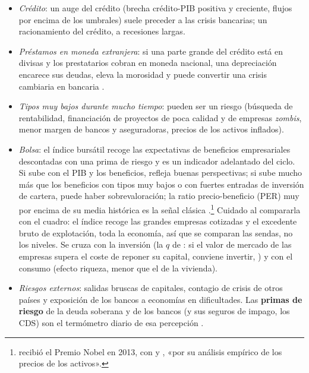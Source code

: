 \documentclass[11pt]{article}
\begin{document}
\begin{itemize}
\begin{itemize}
  \item \emph{con qué se cruza}: consumo (efecto riqueza), inversión residencial, crédito y morosidad, y movilidad laboral (vivienda cara, peor emparejamiento) .
  \end{itemize}
\item \emph{Crédito}: un auge del crédito (brecha crédito-PIB positiva y creciente, flujos por encima de los umbrales) suele preceder a las crisis bancarias; un racionamiento del crédito, a recesiones largas.
\item \emph{Préstamos en moneda extranjera}: si una parte grande del crédito está en divisas y los prestatarios cobran en moneda nacional, una depreciación encarece sus deudas, eleva la morosidad y puede convertir una crisis cambiaria en bancaria \parencite{EHP2005PecadoOriginal}.
\item \emph{Tipos muy bajos durante mucho tiempo}: pueden ser un riesgo (búsqueda de rentabilidad, financiación de proyectos de poca calidad y de empresas \emph{zombis}, menor margen de bancos y aseguradoras, precios de los activos inflados).
\item \emph{Bolsa}: el índice bursátil recoge las expectativas de beneficios empresariales descontadas con una prima de riesgo y es un indicador adelantado del ciclo. Si sube con el PIB y los beneficios, refleja buenas perspectivas; si sube mucho más que los beneficios con tipos muy bajos o con fuertes entradas de inversión de cartera, puede haber sobrevaloración; la ratio precio-beneficio (PER) muy por encima de su media histórica es la señal clásica \parencite{CampbellShiller1998}.\footnote{ recibió el Premio Nobel en 2013, con  y , «por su análisis empírico de los precios de los activos»\nocite{Nobel2013FamaHansenShiller}.} Cuidado al compararla con el cuadro: el índice recoge las grandes empresas cotizadas y el excedente bruto de explotación, toda la economía, así que se comparan las sendas, no los niveles. Se cruza con la inversión (la $q$ de : si el valor de mercado de las empresas supera el coste de reponer su capital, conviene invertir, ) y con el consumo (efecto riqueza, menor que el de la vivienda).
\item \emph{Riesgos externos}: salidas bruscas de capitales, contagio de crisis de otros países y exposición de los bancos a economías en dificultades. Las \textbf{primas de riesgo} de la deuda soberana y de los bancos (y sus seguros de impago, los CDS) son el termómetro diario de esa percepción \parencite{FMI2013CaseStudy}.
\end{itemize}
\end{document}
